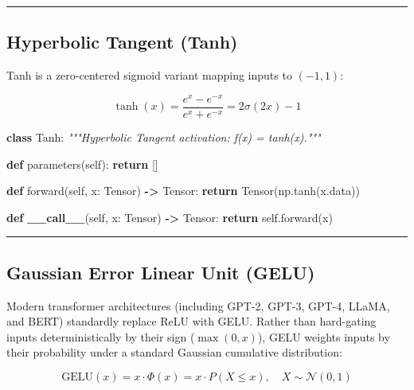 \documentclass[
  letterpaper,
]{scrbook}
\newenvironment{Shaded}{\begin{snugshade}}{\end{snugshade}}
\newcommand{\CommentTok}[1]{\textcolor[rgb]{0.56,0.35,0.01}{\textit{#1}}}
\newcommand{\ControlFlowTok}[1]{\textcolor[rgb]{0.13,0.29,0.53}{\textbf{#1}}}
\newcommand{\FunctionTok}[1]{\textcolor[rgb]{0.13,0.29,0.53}{\textbf{#1}}}
\newcommand{\KeywordTok}[1]{\textcolor[rgb]{0.13,0.29,0.53}{\textbf{#1}}}
\newcommand{\NormalTok}[1]{#1}
\newcommand{\OperatorTok}[1]{\textcolor[rgb]{0.81,0.36,0.00}{\textbf{#1}}}
\newcommand{\VariableTok}[1]{\textcolor[rgb]{0.00,0.00,0.00}{#1}}
\begin{document}
\begin{center}\rule{0.5\linewidth}{0.5pt}\end{center}

\subsection{Hyperbolic Tangent (Tanh)}\label{hyperbolic-tangent-tanh}

Tanh is a zero-centered sigmoid variant mapping inputs to \((-1, 1)\):

\[\tanh(x) = \frac{e^x - e^{-x}}{e^x + e^{-x}} = 2\sigma(2x) - 1\]

\begin{Shaded}
\begin{Highlighting}[]
\KeywordTok{class}\NormalTok{ Tanh:}
    \CommentTok{"""Hyperbolic Tangent activation: f(x) = tanh(x)."""}

    \KeywordTok{def}\NormalTok{ parameters(}\VariableTok{self}\NormalTok{):}
        \ControlFlowTok{return}\NormalTok{ []}

    \KeywordTok{def}\NormalTok{ forward(}\VariableTok{self}\NormalTok{, x: Tensor) }\OperatorTok{{-}\textgreater{}}\NormalTok{ Tensor:}
        \ControlFlowTok{return}\NormalTok{ Tensor(np.tanh(x.data))}

    \KeywordTok{def} \FunctionTok{\_\_call\_\_}\NormalTok{(}\VariableTok{self}\NormalTok{, x: Tensor) }\OperatorTok{{-}\textgreater{}}\NormalTok{ Tensor:}
        \ControlFlowTok{return} \VariableTok{self}\NormalTok{.forward(x)}
\end{Highlighting}
\end{Shaded}

\begin{center}\rule{0.5\linewidth}{0.5pt}\end{center}

\subsection{Gaussian Error Linear Unit
(GELU)}\label{gaussian-error-linear-unit-gelu}

Modern transformer architectures (including GPT-2, GPT-3, GPT-4, LLaMA,
and BERT) standardly replace ReLU with GELU. Rather than hard-gating
inputs deterministically by their sign (\(\max(0, x)\)), GELU weights
inputs by their probability under a standard Gaussian cumulative
distribution:

\[\text{GELU}(x) = x \cdot \Phi(x) = x \cdot P(X \le x), \quad X \sim \mathcal{N}(0, 1)\]
\end{document}
